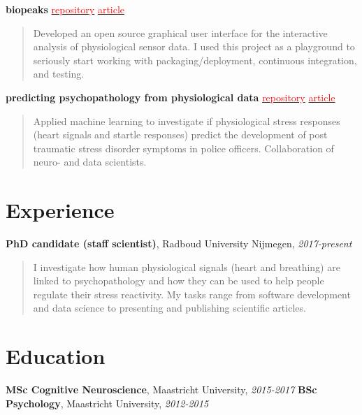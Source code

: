 \documentclass[a4paper, 10pt]{article}
\newcommand{\NewSection}[1]{\section*{\Large #1 \hrulefill}}
\newcommand{\EducationItem}[3]{\textbf{#1}, #2, \textit{#3} \newline}
\newcommand{\ExperienceItem}[4]{\textbf{#1}, #2, \textit{#3} {\newline \begin{quote}  \vspace{-\baselineskip} #4 \vspace{\baselineskip} \end{quote}}}
\newcommand{\Project}[4]{\noindent \textbf{#1} \newline
    \href{#2}{\textcolor{red}{repository}} \textbar{} \href{#3}{\textcolor{red}{article}} \newline
    \begin{quote} \vspace{-\baselineskip} #4 \vspace{\baselineskip} \end{quote}
}
\begin{document}
\Project{biopeaks}
{https://github.com/JanCBrammer/biopeaks}
{https://github.com/JanCBrammer/JanCBrammer.github.io/raw/gh-pages/biopeaks_article.pdf}
{Developed an open source graphical user interface for the interactive analysis of physiological sensor data. I used this project as a playground to seriously start working with packaging/deployment, continuous integration, and testing.}

\Project{predicting psychopathology from physiological data}
{https://github.com/JanCBrammer/PoliceInAction_PTSD_prediction}
{https://osf.io/3kjua/}
{Applied machine learning to investigate if physiological stress responses (heart signals and startle responses) predict the development of post traumatic stress disorder symptoms in police officers. Collaboration of neuro- and data scientists.}


\NewSection{Experience}
\ExperienceItem{PhD candidate (staff scientist)}
{Radboud University Nijmegen}
{2017-present}
{I investigate how human physiological signals (heart and breathing) are linked to psychopathology and how they can be used to help people regulate their stress reactivity. My tasks range from software development and data science to presenting and publishing scientific articles.}


\NewSection{Education}
\EducationItem{MSc Cognitive Neuroscience}{Maastricht University}{2015-2017}
\EducationItem{BSc Psychology}{Maastricht University}{2012-2015}
\end{document}
